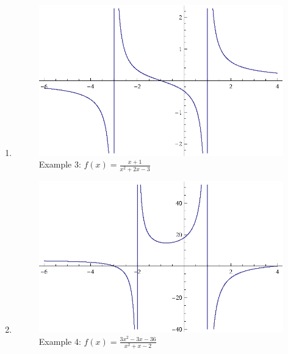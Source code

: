 \documentclass{exam}
\begin{document}
\begin{enumerate}
    \item
      \begin{figure}[H]
        \centering
        \includegraphics[scale=1.0]{example3.eps}
        \caption*{Example 3: $f(x) = \frac{x+1}{x^2+2 x-3}$}
      \end{figure}

    \item
      \begin{figure}[H]
        \centering
        \includegraphics[scale=1.0]{example4.eps}
        \caption*{Example 4: $f(x) = \frac{3 x^2-3 x-36}{x^2+x-2}$}
      \end{figure}


\end{enumerate}
\end{document}
